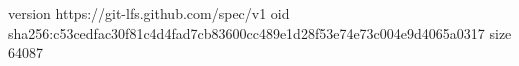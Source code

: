 version https://git-lfs.github.com/spec/v1
oid sha256:c53cedfac30f81c4d4fad7cb83600cc489e1d28f53e74e73c004e9d4065a0317
size 64087
